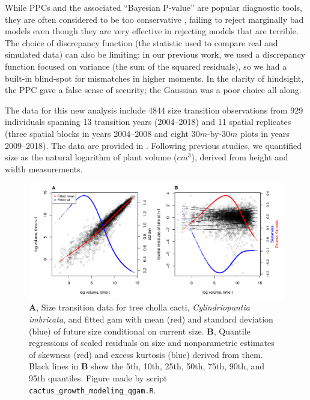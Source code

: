 \documentclass[12pt]{article}
\begin{document}
While PPCs and the associated ``Bayesian P-value'' are popular diagnostic tools, they are often considered to be too conservative \citep{conn2018guide,zhang2014comparative}, failing to reject marginally bad models even though they are very effective in rejecting models that are terrible.
The choice of discrepancy function (the statistic used to compare real and simulated data) can also be limiting: in our previous work, we used a discrepancy function focused on variance (the sum of the squared residuals), so we had a built-in blind-spot for mismatches in higher moments.
In the clarity of hindsight, the PPC gave a false sense of security; the Gaussian was a poor choice all along.

The data for this new analysis include 4844 size transition observations from 929 individuals spanning 13 transition years (2004--2018) and 11 spatial replicates (three spatial blocks in years 2004--2008 and eight $30m$-by-$30m$ plots in years 2009--2018). 
The data are provided in \cite{cactusdata}.
Following previous studies, we quantified size as the natural logarithm of plant volume ($cm^3$), derived from height and width measurements. 

\begin{figure}[tbp]
	\centering
	\includegraphics[width=1.0\textwidth]{figures/cactus_qgam_diagnostics.pdf}
	\caption{\textbf{A}, Size transition data for tree cholla cacti, \emph{Cylindriopuntia imbricata}, and fitted gam with mean (red) and standard deviation (blue) of future size conditional on current size.  \textbf{B}, Quantile regressions of scaled residuals on size and nonparametric estimates of skewness (red) and excess kurtosis (blue) derived from them. Black lines in \textbf{B} show the 5th, 10th, 25th, 50th, 75th, 90th, and 95th quantiles. Figure made by script \texttt{cactus\_growth\_modeling\_qgam.R}.}
	\label{fig:cactus_diagnostics}
\end{figure} 
\end{document}
